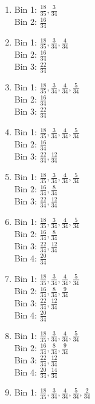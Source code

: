 \documentclass[11pt]{article}
\begin{document}
\begin{enumerate}
\begin{enumerate}
\begin{enumerate}
\item Bin 1: $\frac{18}{35}, \frac{3}{34}$\\
Bin 2: $\frac{16}{34}$\\
\item Bin 1: $\frac{18}{35}, \frac{3}{34}, \frac{4}{34}$\\
Bin 2: $\frac{16}{34}$\\
Bin 3: $\frac{22}{34}$\\
\item Bin 1: $\frac{18}{35}, \frac{3}{34}, \frac{4}{34}, \frac{5}{34}$\\
Bin 2: $\frac{16}{34}$\\
Bin 3: $\frac{22}{34}$\\
\item Bin 1: $\frac{18}{35}, \frac{3}{34}, \frac{4}{34}, \frac{5}{34}$\\
Bin 2: $\frac{16}{34}$\\
Bin 3: $\frac{22}{34}, \frac{12}{34}$\\
\item Bin 1: $\frac{18}{35}, \frac{3}{34}, \frac{4}{34}, \frac{5}{34}$\\
Bin 2: $\frac{16}{34}, \frac{8}{34}$\\
Bin 3: $\frac{22}{34}, \frac{12}{34}$\\
\item Bin 1: $\frac{18}{35}, \frac{3}{34}, \frac{4}{34}, \frac{5}{34}$\\
Bin 2: $\frac{16}{34}, \frac{8}{34}$\\
Bin 3: $\frac{22}{34}, \frac{12}{34}$\\
Bin 4: $\frac{20}{34}$\\
\item Bin 1: $\frac{18}{35}, \frac{3}{34}, \frac{4}{34}, \frac{5}{34}$\\
Bin 2: $\frac{16}{34}, \frac{8}{34}, \frac{9}{34}$\\
Bin 3: $\frac{22}{34}, \frac{12}{34}$\\
Bin 4: $\frac{20}{34}$\\
\item Bin 1: $\frac{18}{35}, \frac{3}{34}, \frac{4}{34}, \frac{5}{34}$\\
Bin 2: $\frac{16}{34}, \frac{8}{34}, \frac{9}{34}$\\
Bin 3: $\frac{22}{34}, \frac{12}{34}$\\
Bin 4: $\frac{20}{34}, \frac{14}{34}$\\
\item Bin 1: $\frac{18}{35}, \frac{3}{34}, \frac{4}{34}, \frac{5}{34}, \frac{2}{34}$\\

\end{enumerate}
\end{enumerate}
\end{enumerate}
\end{document}
